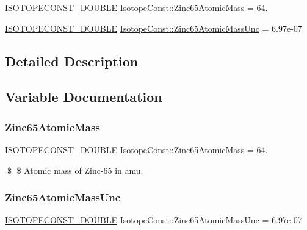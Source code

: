 \begin{DoxyCompactItemize}
\item 
\mbox{\hyperlink{group___isotope_const-_macros_ga8f45a7272ce02c0b4c65c44636ed719a}{I\+S\+O\+T\+O\+P\+E\+C\+O\+N\+S\+T\+\_\+\+D\+O\+U\+B\+LE}} \mbox{\hyperlink{group___isotope_const-_zinc-_zn65_gaa8c6884acc55cdfeef245012b9b33684}{Isotope\+Const\+::\+Zinc65\+Atomic\+Mass}} = 64.
\item 
\mbox{\hyperlink{group___isotope_const-_macros_ga8f45a7272ce02c0b4c65c44636ed719a}{I\+S\+O\+T\+O\+P\+E\+C\+O\+N\+S\+T\+\_\+\+D\+O\+U\+B\+LE}} \mbox{\hyperlink{group___isotope_const-_zinc-_zn65_ga465a194b18ff80070de52c1b7ff85b1b}{Isotope\+Const\+::\+Zinc65\+Atomic\+Mass\+Unc}} = 6.\+97e-\/07
\end{DoxyCompactItemize}


\subsection{Detailed Description}


\subsection{Variable Documentation}
\mbox{\label{group___isotope_const-_zinc-_zn65_gaa8c6884acc55cdfeef245012b9b33684}} 
\subsubsection{\texorpdfstring{Zinc65\+Atomic\+Mass}{Zinc65AtomicMass}}
{\footnotesize\ttfamily \mbox{\hyperlink{group___isotope_const-_macros_ga8f45a7272ce02c0b4c65c44636ed719a}{I\+S\+O\+T\+O\+P\+E\+C\+O\+N\+S\+T\+\_\+\+D\+O\+U\+B\+LE}} Isotope\+Const\+::\+Zinc65\+Atomic\+Mass = 64.}

\$ \$ Atomic mass of Zinc-\/65 in amu. \mbox{\label{group___isotope_const-_zinc-_zn65_ga465a194b18ff80070de52c1b7ff85b1b}} 
\subsubsection{\texorpdfstring{Zinc65\+Atomic\+Mass\+Unc}{Zinc65AtomicMassUnc}}
{\footnotesize\ttfamily \mbox{\hyperlink{group___isotope_const-_macros_ga8f45a7272ce02c0b4c65c44636ed719a}{I\+S\+O\+T\+O\+P\+E\+C\+O\+N\+S\+T\+\_\+\+D\+O\+U\+B\+LE}} Isotope\+Const\+::\+Zinc65\+Atomic\+Mass\+Unc = 6.\+97e-\/07}

